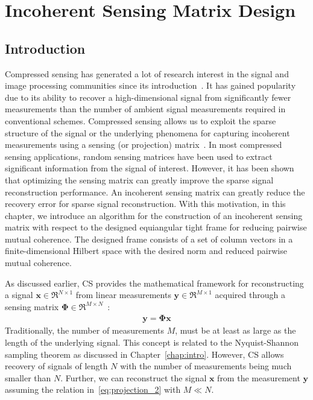 \chapter{Incoherent Sensing Matrix Design}
\label{chap:chap3}
%
\section{Introduction}
Compressed sensing has generated a lot of research interest in the signal and image processing communities since its introduction~\cite{Donoho, TaoNear, Taocandes}. It has gained popularity due to its ability to recover a high-dimensional signal from significantly fewer measurements than the number of ambient signal measurements required in conventional schemes. Compressed sensing allows us to exploit the sparse structure of the signal or the underlying phenomena for capturing incoherent measurements using a sensing (or projection) matrix~\cite{Elad}. In most compressed sensing applications, random sensing matrices have been used to extract significant information from the signal of interest. However, it has been shown that optimizing the sensing matrix can greatly improve the sparse signal reconstruction performance. An incoherent sensing matrix can greatly reduce the recovery error for sparse signal reconstruction. With this motivation, in this chapter, we introduce an algorithm for the construction of an incoherent sensing matrix with respect to the designed equiangular tight frame for reducing pairwise mutual coherence. The designed frame consists of a set of column vectors in a finite-dimensional Hilbert space with the desired norm and reduced pairwise mutual coherence. 

As discussed earlier, CS provides the mathematical framework for reconstructing a signal $\bm{x} \in \Re^{N \times 1}$ from linear measurements $\bm{y} \in \Re^{M \times 1}$ acquired through a sensing matrix $\bm{\Phi} \in \Re^{M \times N}$~\cite{RichardCS}:
%
\begin{align}
\label{eq:projection_2}
     \bm{y} = \bm{\Phi}\bm{x}
\end{align}
%
Traditionally, the number of measurements $M$, must be at least as large as the length of the underlying signal. This concept is related to the Nyquist-Shannon sampling theorem as discussed in Chapter~\ref{chap:intro}. However, CS allows recovery of signals of length $N$ with the number of measurements being much smaller than $N$. Further, we can reconstruct the signal $\bm{x}$ from the measurement $\bm{y}$ assuming the relation in~\eqref{eq:projection_2} with $M \ll N$. 

